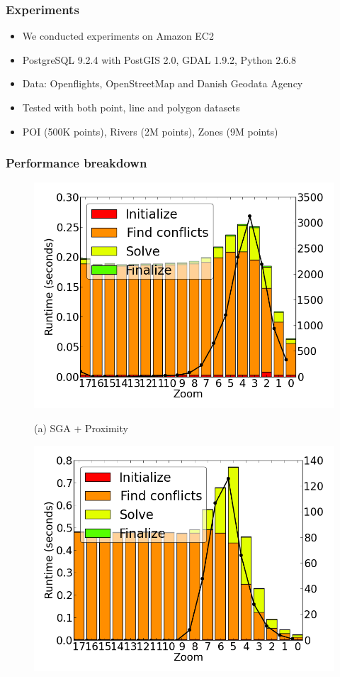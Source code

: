 \documentclass{beamer}
\begin{document}
\frame
{
	\frametitle{Experiments}
	\begin{itemize}[<+->]
	\item We conducted experiments on Amazon EC2
	\item PostgreSQL 9.2.4 with PostGIS 2.0, GDAL 1.9.2, Python 2.6.8
	\item Data: Openflights, OpenStreetMap and Danish Geodata Agency
	\item Tested with both point, line and polygon datasets
	\item POI (500K points), Rivers (2M points), Zones (9M points)
	\end{itemize}
}

\frame
{
	\frametitle{Performance breakdown}


\begin{figure}[tb]
  \begin{minipage}{0.45\linewidth}
    \centerline{\includegraphics[width=1\linewidth]{./figs/prelim_pnt_7k_airports_heuristic_B.png}}
    \centerline{(a) SGA + Proximity}
  \end{minipage} \hfill
  \begin{minipage}{0.45\linewidth}
    \centerline{\includegraphics[width=1\linewidth]{./figs/prelim_pnt_7k_airports_lp_A.png}}

\end{minipage}
\end{figure}}
\end{document}
